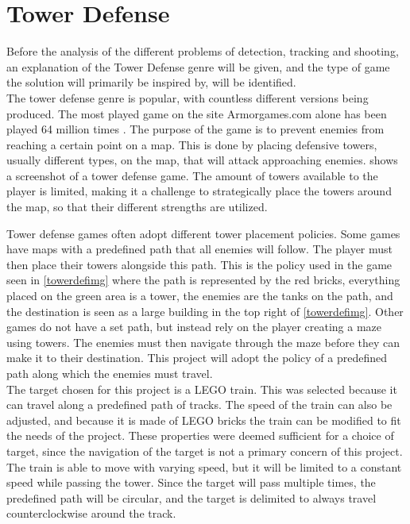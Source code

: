\section{Tower Defense}\label{sec:towerdef}
Before the analysis of the different problems of detection, tracking and shooting, an explanation of the Tower Defense genre will be given, and the type of game the solution will primarily be inspired by, will be identified.\\

The tower defense genre is popular, with countless different versions being produced. The most played game on the site Armorgames.com alone has been played 64 million times \cite{td1}. The purpose of the game is to prevent enemies from reaching a certain point on a map. This is done by placing defensive towers, usually different types, on the map, that will attack approaching enemies.  shows a screenshot of a tower defense game. The amount of towers available to the player is limited, making it a challenge to strategically place the towers around the map, so that their different strengths are utilized.


Tower defense games often adopt different tower placement policies. Some games have maps with a predefined path that all enemies will follow. The player must then place their towers alongside this path. This is the policy used in the game seen in \cref{towerdefimg} where the path is represented by the red bricks, everything placed on the green area is a tower, the enemies are the tanks on the path, and the destination is seen as a large building in the top right of \cref{towerdefimg}. Other games do not have a set path, but instead rely on the player creating a maze using towers. The enemies must then navigate through the maze before they can make it to their destination. This project will adopt the policy of a predefined path along which the enemies must travel. \\ %

\label{targetdelim}The target chosen for this project is a LEGO train. This was selected because it can travel along a predefined path of tracks. The speed of the train can also be adjusted, and because it is made of LEGO bricks the train can be modified to fit the needs of the project. These properties were deemed sufficient for a choice of target, since the navigation of the target is not a primary concern of this project. The train is able to move with varying speed, but it will be limited to a constant speed while passing the tower. Since the target will pass multiple times, the predefined path will be circular, and the target is delimited to always travel counterclockwise around the track.




